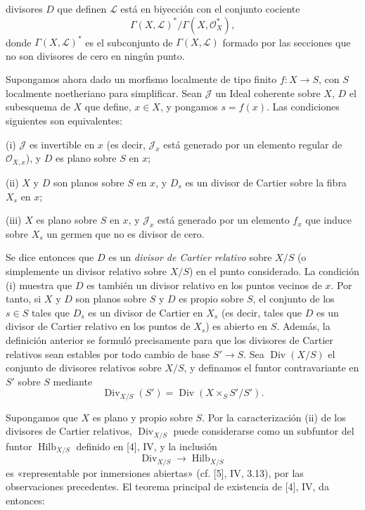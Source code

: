 divisores $D$ que definen $\mathcal L$ está en biyección con el conjunto
cociente
\[
\Gamma(X,\mathcal L)^*/\Gamma(X,\mathcal O_X^*),
\]
donde $\Gamma(X,\mathcal L)^*$ es el subconjunto de
$\Gamma(X,\mathcal L)$ formado por las secciones que no son divisores de cero
en ningún punto.

Supongamos ahora dado un morfismo localmente de tipo finito
$f:X\longrightarrow S$, con $S$ localmente noetheriano para simplificar. Sean
$\mathcal J$ un Ideal coherente sobre $X$, $D$ el subesquema de $X$ que define,
$x\in X$, y pongamos $s=f(x)$. Las condiciones siguientes son equivalentes:

\noindent (i) $\mathcal J$ es invertible en $x$ (es decir, $\mathcal J_x$ está
generado por un elemento regular de $\mathcal O_{X,x}$), y $D$ es plano sobre
$S$ en $x$;

\noindent (ii) $X$ y $D$ son planos sobre $S$ en $x$, y $D_s$ es un divisor de
Cartier sobre la fibra $X_s$ en $x$;

\noindent (iii) $X$ es plano sobre $S$ en $x$, y $\mathcal J_x$ está generado
por un elemento $f_x$ que induce sobre $X_s$ un germen que no es divisor de
cero.

Se dice entonces que $D$ es un \emph{divisor de Cartier relativo} sobre $X/S$
(o simplemente un divisor relativo sobre $X/S$) en el punto considerado. La
condición (i) muestra que $D$ es también un divisor relativo en los puntos
vecinos de $x$. Por tanto, si $X$ y $D$ son planos sobre $S$ y $D$ es propio
sobre $S$, el conjunto de los $s\in S$ tales que $D_s$ es un divisor de Cartier
en $X_s$ (es decir, tales que $D$ es un divisor de Cartier relativo en los
puntos de $X_s$) es abierto en $S$. Además, la definición anterior se formuló
precisamente para que los divisores de Cartier relativos sean estables por todo
cambio de base $S'\longrightarrow S$. Sea $\operatorname{Div}(X/S)$ el
conjunto de divisores relativos sobre $X/S$, y definamos el funtor
contravariante en $S'$ sobre $S$ mediante
\[
\operatorname{Div}_{X/S}(S')=
\operatorname{Div}(X\times_SS'/S').
\]

Supongamos que $X$ es plano y propio sobre $S$. Por la caracterización (ii) de
los divisores de Cartier relativos, $\operatorname{Div}_{X/S}$ puede
considerarse como un subfuntor del funtor $\operatorname{Hilb}_{X/S}$ definido
en [4], IV, y la inclusión
\[
\operatorname{Div}_{X/S}\longrightarrow\operatorname{Hilb}_{X/S}
\]
es «representable por inmersiones abiertas» (cf. [5], IV, 3.13), por las
observaciones precedentes. El teorema principal de existencia de [4], IV, da
entonces:

